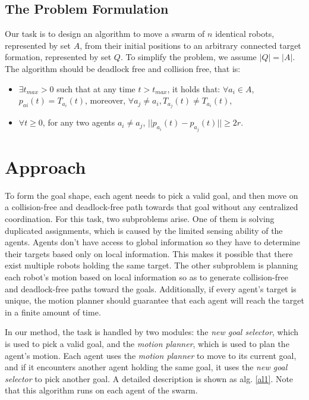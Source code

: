 \documentclass[journal]{IEEEtran}
\begin{document}
\subsection{The Problem Formulation}
Our task is to design an algorithm to move a swarm of $n$ identical robots, represented by set $A$, from their initial positions to an arbitrary connected target formation, represented by set $Q$. To simplify the problem, we assume $|Q|=|A|$. The algorithm should be deadlock free and collision free, that is:
\begin{itemize}

    \item $\exists t_{max} > 0$ such that at any time $t > t_{max}$, it holds that: $\forall a_i \in A$, $p_{ai}(t) = T_{a_i}(t)$, moreover, $\forall a_j \neq a_i, T_{a_j}(t) \neq T_{a_i}(t)$,
    \item  $\forall t\geq0$, for any two agents $a_i\neq a_j$, $||p_{a_i}(t) - p_{a_j}(t)|| \geq 2r$. 

\end{itemize}







\section{Approach}
To form the goal shape, each agent needs to pick a valid goal, and then move on a collision-free and deadlock-free path towards that goal without any centralized coordination. For this task, two subproblems arise. One of them is solving duplicated assignments, which is caused by the limited sensing ability of the agents. Agents don't have access to global information so they have to determine their targets based only on local information. This makes it possible that there exist multiple robots holding the same target. The other subproblem is planning each robot's motion based on local information so as to generate collision-free and deadlock-free paths toward the goals.  Additionally, if every agent's target is unique, the motion planner should guarantee that each agent will reach the target in a finite amount of time. 

In our method, the task is handled by two modules: the \textit{new goal selector}, which is used to pick a valid goal, and the \textit{motion planner}, which is used to plan the agent's motion. Each agent uses the \textit{motion planner} to move to its current goal, and if it encounters another agent holding the same goal, it uses the \textit{new goal selector} to pick another goal. A detailed description is shown as alg. \ref{al1}. Note that this algorithm runs on each agent of the swarm.
\end{document}
